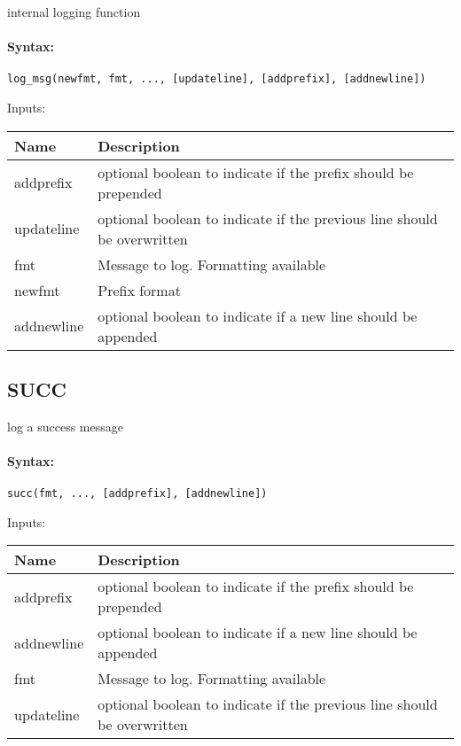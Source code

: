 internal logging function

\paragraph{Syntax:} \verb|log_msg(newfmt, fmt, ..., [updateline], [addprefix], [addnewline])|

\bigskip
Inputs:

\begin{tabular}{|p{}|p{}|}
\hline
\textbf{Name} & \textbf{Description} \\
\hline \hline
addprefix & optional boolean to indicate if the prefix should be prepended  \\ \hline
updateline & optional boolean to indicate if the previous line should be overwritten  \\ \hline
fmt & Message to log. Formatting available  \\ \hline
newfmt & Prefix format  \\ \hline
addnewline & optional boolean to indicate if a new line should be appended  \\ \hline
\end{tabular}


\subsection{SUCC}

log a success message

\paragraph{Syntax:} \verb|succ(fmt, ..., [addprefix], [addnewline])|

\bigskip
Inputs:

\begin{tabular}{|p{}|p{}|}
\hline
\textbf{Name} & \textbf{Description} \\
\hline \hline
addprefix & optional boolean to indicate if the prefix should be prepended  \\ \hline
addnewline & optional boolean to indicate if a new line should be appended  \\ \hline
fmt & Message to log. Formatting available  \\ \hline
updateline & optional boolean to indicate if the previous line should be overwritten  \\ \hline
\end{tabular}


